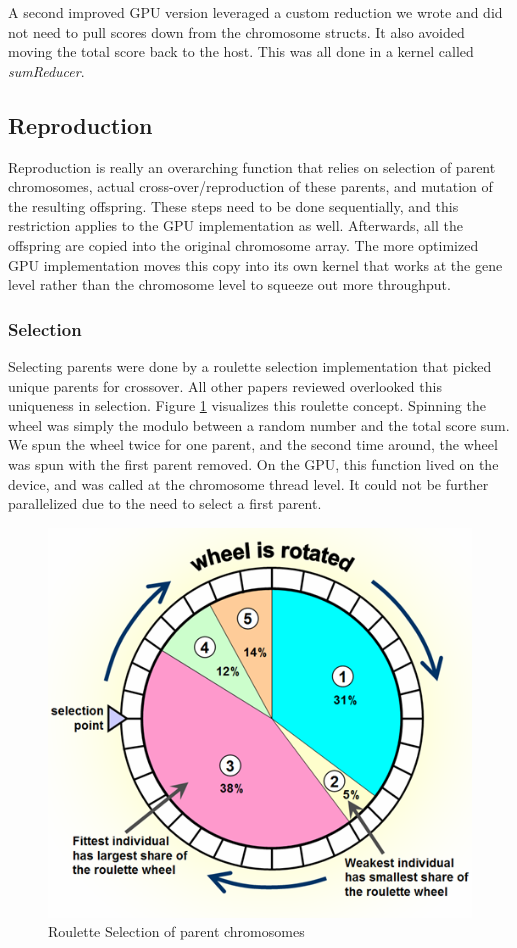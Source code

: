 \documentclass[11pt]{article}       %
\begin{document}
A second improved GPU version leveraged a custom reduction we wrote and did not need to pull scores down from the chromosome structs. It also avoided moving the total score back to the host. This was all done in a kernel called \textit{sumReducer}.

\subsection{Reproduction}
Reproduction is really an overarching function that relies on selection of parent chromosomes, actual cross-over/reproduction of these parents, and mutation of the resulting offspring. These steps need to be done sequentially, and this restriction applies to the GPU implementation as well. Afterwards, all the offspring are copied into the original chromosome array. The more optimized GPU implementation moves this copy into its own kernel that works at the gene level rather than the chromosome level to squeeze out more throughput.

\subsubsection{Selection}
Selecting parents were done by a roulette selection implementation that picked unique parents for crossover. All other papers reviewed overlooked this uniqueness in selection. Figure \ref{fig:roulette} visualizes this roulette concept. Spinning the wheel was simply the modulo between a random number and the total score sum. We spun the wheel twice for one parent, and the second time around, the wheel was spun with the first parent removed. On the GPU, this function lived on the device, and was called at the chromosome thread level. It could not be further parallelized due to the need to select a first parent.

\begin{figure}[h]
    \centering
    \includegraphics[width=0.5\linewidth]{Figures/roulette_selection.png}
    \caption{Roulette Selection of parent chromosomes}
    \label{fig:roulette}
\end{figure}
\end{document}
